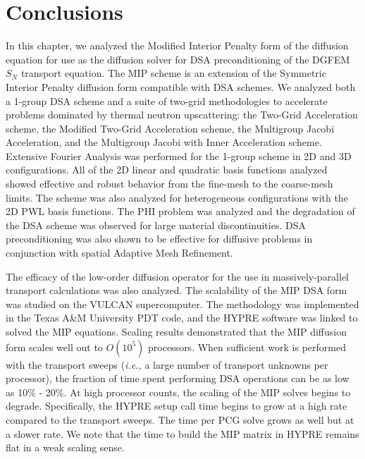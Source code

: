 \section{Conclusions}
\label{sec::DSA_Conclusions}

In this chapter, we analyzed the Modified Interior Penalty form of the diffusion equation for use as the diffusion solver for DSA preconditioning of the DGFEM $S_N$ transport equation. The MIP scheme is an extension of the Symmetric Interior Penalty diffusion form compatible with DSA schemes. We analyzed both a 1-group DSA scheme and a suite of two-grid methodologies to accelerate problems dominated by thermal neutron upscattering: the Two-Grid Acceleration scheme, the Modified Two-Grid Acceleration scheme, the Multigroup Jacobi Acceleration, and the Multigroup Jacobi with Inner Acceleration scheme. Extensive Fourier Analysis was performed for the 1-group scheme in 2D and 3D configurations. All of the 2D linear and quadratic basis functions analyzed showed effective and robust behavior from the fine-mesh to the coarse-mesh limits. The scheme was also analyzed for heterogeneous configurations with the 2D PWL basis functions. The PHI problem was analyzed and the degradation of the DSA scheme was observed for large material discontinuities. DSA preconditioning was also shown to be effective for diffusive problems in conjunction with spatial Adaptive Mesh Refinement. 

The efficacy of the low-order diffusion operator for the use in massively-parallel transport calculations was also analyzed. The scalability of the MIP DSA form was studied on the VULCAN supercomputer. The methodology was implemented in the Texas A\&M University PDT code, and the HYPRE software was linked to solved the MIP equations. Scaling results demonstrated that the MIP diffusion form scales well out to $O(10^5)$ processors. When sufficient work is performed with the transport sweeps ({\em i.e.,} a large number of transport unknowns per processor), the fraction of time spent performing DSA operations can be as low as 10\% - 20\%. At high processor counts, the scaling of the MIP solves begins to degrade. Specifically, the HYPRE setup call time begins to grow at a high rate compared to the transport sweeps. The time per PCG solve grows as well but at a slower rate. We note that the time to build the MIP matrix in HYPRE remains flat in a weak scaling sense.

